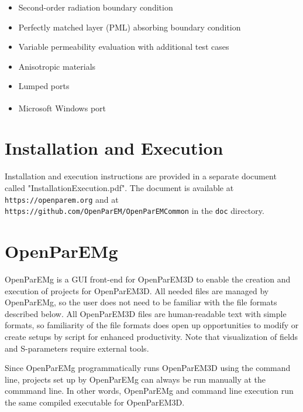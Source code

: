 \documentclass[titlepage]{article}
\renewcommand\_{\textunderscore\linebreak[1]}
\begin{document}
\begin{table}[ht]
\caption{OpenParEM List of Anticipated Future Upgrades}
\noindent \hrulefill
\begin{itemize}[nosep]
   \item Second-order radiation boundary condition
   \item Perfectly matched layer (PML) absorbing boundary condition
   \item Variable permeability evaluation with additional test cases
   \item Anisotropic materials
   \item Lumped ports
   \item Microsoft Windows\textsuperscript{\textregistered} port
\end{itemize}
\noindent \hrulefill
\label{table:upgrades}
\end{table}

\section{Installation and Execution}

Installation and execution instructions are provided in a separate document called \newline"Installation\_Execution.pdf".  The document is available at \texttt{https://openparem.org} and at \newline\texttt{https://github.com/OpenParEM/OpenParEMCommon} in the \texttt{doc} directory. 

\section{OpenParEMg}

OpenParEMg is a GUI front-end for OpenParEM3D to enable the creation and execution of projects for OpenParEM3D.  All needed files are managed by OpenParEMg, so the user does not need to be familiar with the file formats described below.  All OpenParEM3D files are human-readable text with simple formats, so familiarity of the file formats does open up opportunities to modify or create setups by script for enhanced productivity.  Note that visualization of fields and S-parameters require external tools.

Since OpenParEMg programmatically runs OpenParEM3D using the command line, projects set up by OpenParEMg can always be run manually at the commmand line.  In other words, OpenParEMg and command line execution run the same compiled executable for OpenParEM3D.
\end{document}
